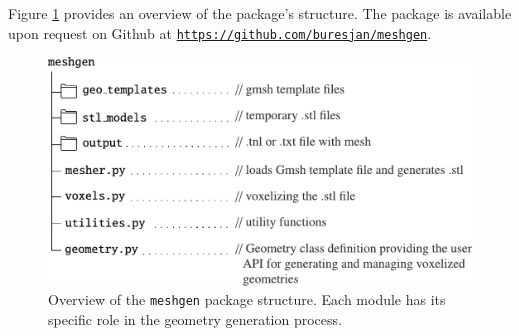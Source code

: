 Figure  \ref{fig:meshgen structure} provides an overview of the package's structure.  The package is available upon request on Github at \href{https://github.com/buresjan/meshgen}{\texttt{https://github.com/buresjan/meshgen}}.

\begin{figure}[H]
	\centering
	\vspace{6mm}
	\includegraphics[width=.85\textwidth]{figures/package_overview.pdf}
	\vspace{7mm}
	\caption{Overview of the \texttt{meshgen} package structure. Each module has its specific role in the geometry generation process.}
	\label{fig:meshgen structure}
\end{figure}